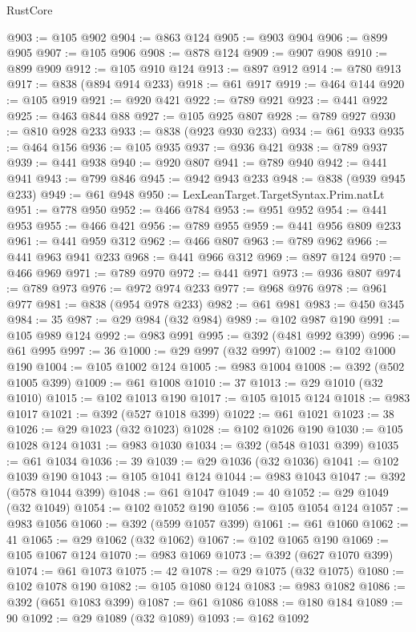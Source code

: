 \begin{lexlean}{RustCore}
\begin{coremodule}
@903 := @105 @902
@904 := @863 @124
@905 := @903 @904
@906 := @899 @905
@907 := @105 @906
@908 := @878 @124
@909 := @907 @908
@910 := @899 @909
@912 := @105 @910 @124
@913 := @897 @912
@914 := @780 @913
@917 := @838 (@894 @914 @233)
@918 := @61 @917
@919 := @464 @144
@920 := @105 @919
@921 := @920 @421
@922 := @789 @921
@923 := @441 @922
@925 := @463 @844 @88
@927 := @105 @925 @807
@928 := @789 @927
@930 := @810 @928 @233
@933 := @838 (@923 @930 @233)
@934 := @61 @933
@935 := @464 @156
@936 := @105 @935
@937 := @936 @421
@938 := @789 @937
@939 := @441 @938
@940 := @920 @807
@941 := @789 @940
@942 := @441 @941
@943 := @799 @846
@945 := @942 @943 @233
@948 := @838 (@939 @945 @233)
@949 := @61 @948
@950 := LexLeanTarget.TargetSyntax.Prim.natLt
@951 := @778 @950
@952 := @466 @784
@953 := @951 @952
@954 := @441 @953
@955 := @466 @421
@956 := @789 @955
@959 := @441 @956 @809 @233
@961 := @441 @959 @312
@962 := @466 @807
@963 := @789 @962
@966 := @441 @963 @941 @233
@968 := @441 @966 @312
@969 := @897 @124
@970 := @466 @969
@971 := @789 @970
@972 := @441 @971
@973 := @936 @807
@974 := @789 @973
@976 := @972 @974 @233
@977 := @968 @976
@978 := @961 @977
@981 := @838 (@954 @978 @233)
@982 := @61 @981
@983 := @450 @345
@984 := 35
@987 := @29 @984 (@32 @984)
@989 := @102 @987 @190
@991 := @105 @989 @124
@992 := @983 @991
@995 := @392 (@481 @992 @399)
@996 := @61 @995
@997 := 36
@1000 := @29 @997 (@32 @997)
@1002 := @102 @1000 @190
@1004 := @105 @1002 @124
@1005 := @983 @1004
@1008 := @392 (@502 @1005 @399)
@1009 := @61 @1008
@1010 := 37
@1013 := @29 @1010 (@32 @1010)
@1015 := @102 @1013 @190
@1017 := @105 @1015 @124
@1018 := @983 @1017
@1021 := @392 (@527 @1018 @399)
@1022 := @61 @1021
@1023 := 38
@1026 := @29 @1023 (@32 @1023)
@1028 := @102 @1026 @190
@1030 := @105 @1028 @124
@1031 := @983 @1030
@1034 := @392 (@548 @1031 @399)
@1035 := @61 @1034
@1036 := 39
@1039 := @29 @1036 (@32 @1036)
@1041 := @102 @1039 @190
@1043 := @105 @1041 @124
@1044 := @983 @1043
@1047 := @392 (@578 @1044 @399)
@1048 := @61 @1047
@1049 := 40
@1052 := @29 @1049 (@32 @1049)
@1054 := @102 @1052 @190
@1056 := @105 @1054 @124
@1057 := @983 @1056
@1060 := @392 (@599 @1057 @399)
@1061 := @61 @1060
@1062 := 41
@1065 := @29 @1062 (@32 @1062)
@1067 := @102 @1065 @190
@1069 := @105 @1067 @124
@1070 := @983 @1069
@1073 := @392 (@627 @1070 @399)
@1074 := @61 @1073
@1075 := 42
@1078 := @29 @1075 (@32 @1075)
@1080 := @102 @1078 @190
@1082 := @105 @1080 @124
@1083 := @983 @1082
@1086 := @392 (@651 @1083 @399)
@1087 := @61 @1086
@1088 := @180 @184
@1089 := 90
@1092 := @29 @1089 (@32 @1089)
@1093 := @162 @1092

\end{coremodule}
\end{lexlean}
